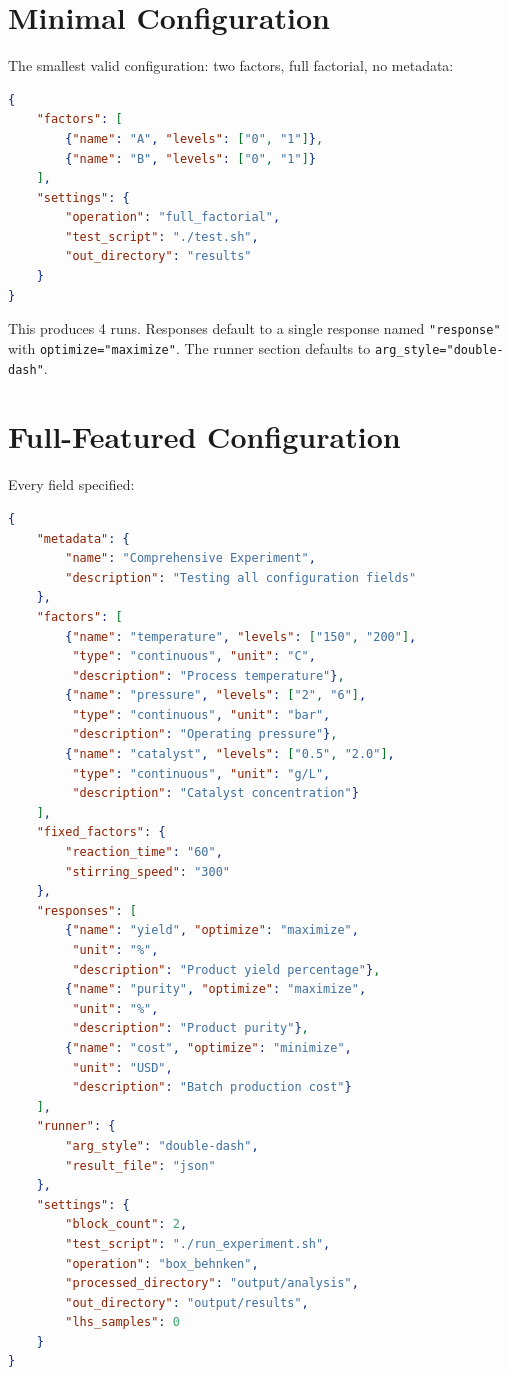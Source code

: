 \documentclass[11pt]{book}
\begin{document}
\section{Minimal Configuration}

The smallest valid configuration: two factors, full factorial, no metadata:

\begin{lstlisting}[language=json]
{
    "factors": [
        {"name": "A", "levels": ["0", "1"]},
        {"name": "B", "levels": ["0", "1"]}
    ],
    "settings": {
        "operation": "full_factorial",
        "test_script": "./test.sh",
        "out_directory": "results"
    }
}
\end{lstlisting}

This produces 4 runs. Responses default to a single response named \texttt{"response"} with \texttt{optimize="maximize"}. The runner section defaults to \texttt{arg\_style="double-dash"}.

\section{Full-Featured Configuration}

Every field specified:

\begin{lstlisting}[language=json]
{
    "metadata": {
        "name": "Comprehensive Experiment",
        "description": "Testing all configuration fields"
    },
    "factors": [
        {"name": "temperature", "levels": ["150", "200"],
         "type": "continuous", "unit": "C",
         "description": "Process temperature"},
        {"name": "pressure", "levels": ["2", "6"],
         "type": "continuous", "unit": "bar",
         "description": "Operating pressure"},
        {"name": "catalyst", "levels": ["0.5", "2.0"],
         "type": "continuous", "unit": "g/L",
         "description": "Catalyst concentration"}
    ],
    "fixed_factors": {
        "reaction_time": "60",
        "stirring_speed": "300"
    },
    "responses": [
        {"name": "yield", "optimize": "maximize",
         "unit": "%",
         "description": "Product yield percentage"},
        {"name": "purity", "optimize": "maximize",
         "unit": "%",
         "description": "Product purity"},
        {"name": "cost", "optimize": "minimize",
         "unit": "USD",
         "description": "Batch production cost"}
    ],
    "runner": {
        "arg_style": "double-dash",
        "result_file": "json"
    },
    "settings": {
        "block_count": 2,
        "test_script": "./run_experiment.sh",
        "operation": "box_behnken",
        "processed_directory": "output/analysis",
        "out_directory": "output/results",
        "lhs_samples": 0
    }
}
\end{lstlisting}
\end{document}
